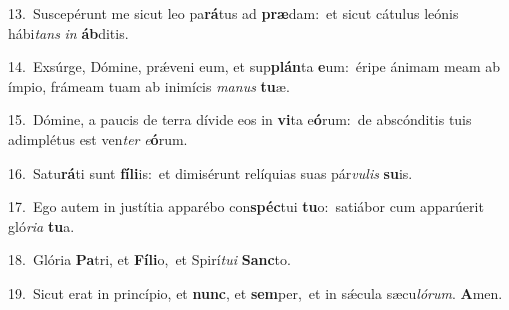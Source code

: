 {\numbfont\textcolor{\numbcolor}{13.}}~Suscepérunt me sicut leo pa\-\textbf{rá}\-tus ad \textbf{præ}\-dam:~\star et sicut cátulus leónis hábi\textit{tans} \textit{in} \textbf{áb}\-ditis.\par
{\numbfont\textcolor{\numbcolor}{14.}}~Exsúrge, Dómine, prǽveni eum, et sup\-\textbf{plán}\-ta \textbf{e}\-um:~\star éripe ánimam meam ab ímpio, frámeam tuam ab inimícis \textit{ma}\-\textit{nus} \textbf{tu}\-æ.\par
{\numbfont\textcolor{\numbcolor}{15.}}~Dómine, a paucis de terra dívide eos in \textbf{vi}\-ta e\-\textbf{ó}\-rum:~\star de abscónditis tuis adimplétus est ven\textit{ter} \textit{e}\-\textbf{ó}rum.\par
{\numbfont\textcolor{\numbcolor}{16.}}~Satu\-\textbf{rá}\-ti sunt \textbf{fí}\-\textbf{li}is:~\star et dimisérunt relíquias suas pár\-\textit{vu}\-\textit{lis} \textbf{su}\-is.\par
{\numbfont\textcolor{\numbcolor}{17.}}~Ego autem in justítia apparébo con\-\textbf{spéc}\-tui \textbf{tu}\-o:~\star satiábor cum apparúerit gló\-\textit{ri}\-\textit{a} \textbf{tu}\-a.\par
{\numbfont\textcolor{\numbcolor}{18.}}~Glória \textbf{Pa}\-tri, et \textbf{Fí}\-\textbf{li}o,~\star et Spirí\-\textit{tu}\-\textit{i} \textbf{Sanc}\-to.\par
{\numbfont\textcolor{\numbcolor}{19.}}~Sicut erat in princípio, et \textbf{nunc}\-, et \textbf{sem}\-per,~\star et in sǽcula sæcu\-\textit{ló}\-\textit{rum}. \textbf{A}\-men.\par
